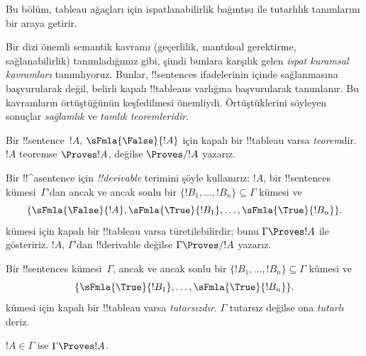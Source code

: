 \documentclass[../../../include/open-logic-section]{subfiles}
\begin{document}
      {}
      {}
      

\begin{editorial}
Bu bölüm, tableau ağaçları için ispatlanabilirlik bağıntısı ile tutarlılık
tanımlarını bir araya getirir.
\end{editorial}

\begin{explain}
Bir dizi önemli semantik kavramı (geçerlilik, mantıksal gerektirme,
sağlanabilirlik) tanımladığımız gibi, şimdi bunlara karşılık gelen
\emph{ispat kuramsal kavramları} tanımlıyoruz. Bunlar, !!{sentence}s
ifadelerinin  içinde sağlanmasına başvurularak değil, belirli
kapalı !!{tableau}s varlığına başvurularak tanımlanır. Bu kavramların
örtüştüğünün keşfedilmesi önemliydi. Örtüştüklerini söyleyen sonuçlar
\emph{sağlamlık} ve \emph{tamlık teoremleridir}.
\end{explain}


\begin{defn}[Teoremler]
Bir !!{sentence}~$!A$, $\sFmla{\False}{!A}$ için kapalı bir !!{tableau}
varsa \emph{teorem}dir. $!A$ teoremse $\Proves !A$, değilse $\Proves/ !A$
yazarız.
\end{defn}

\begin{defn}[!!^{derivability}]
Bir !!^a{sentence} için \emph{!!{derivable}} terimini şöyle kullanırız:
$!A$, bir !!{sentence}s kümesi~$\Gamma$'dan ancak ve ancak sonlu bir
$\{!B_1, \dots, !B_n\} \subseteq \Gamma$ kümesi ve
\[
\{
  \sFmla{\False}{!A},
  \sFmla{\True}{!B_1}, \dots,
  \sFmla{\True}{!B_n}
  \}.
\]
kümesi için kapalı bir !!{tableau} varsa türetilebilirdir; bunu
$\Gamma \Proves !A$ ile gösteririz. $!A$, $\Gamma$'dan !!{derivable}
değilse $\Gamma \Proves/ !A$ yazarız.
\end{defn}

\begin{defn}[Tutarlılık]
Bir !!{sentence}s kümesi~$\Gamma$, ancak ve ancak sonlu bir
$\{!B_1, \dots, !B_n\} \subseteq \Gamma$ kümesi ve
\[
\{
  \sFmla{\True}{!B_1}, \dots,
  \sFmla{\True}{!B_n}  
  \}.
\]
kümesi için kapalı bir !!{tableau} varsa \emph{tutarsızdır}. $\Gamma$
tutarsız değilse ona \emph{tutarlı} deriz.
\end{defn}

\begin{prop}[Yansımalılık]
$!A \in \Gamma$ ise $\Gamma \Proves !A$.
\end{prop}
\end{document}
